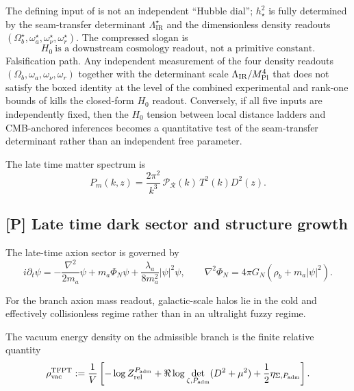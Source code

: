 \begin{remark}
The defining input of  is not an independent ``Hubble dial'';
$h_\star^2$ is fully determined by the seam-transfer determinant $\Lambda_{\mathrm{IR}}^\star$ and
the dimensionless density readouts $(\Omega_b^\star,\omega_a^\star,\omega_\nu^\star,\omega_r^\star)$.
The compressed slogan is
\[
\boxed{\;H_0\ \text{is a downstream cosmology readout, not a primitive constant.}\;}
\]
Falsification path. Any independent measurement of the four density readouts
$(\Omega_b,\omega_a,\omega_\nu,\omega_r)$ together with the determinant scale
$\Lambda_{\mathrm{IR}}/M_{\mathrm{Pl}}^4$ that does not satisfy the boxed identity at the level of the
combined experimental and rank-one bounds of  kills the closed-form
$H_0$ readout. Conversely, if all five inputs are independently fixed, then the
$H_0$ tension between local distance ladders and CMB-anchored inferences becomes a quantitative test
of the seam-transfer determinant rather than an independent free parameter.
\end{remark}

\begin{conjecture}
\label{cor:matter_power_spectrum_readout}
The late time matter spectrum is
\[
P_m(k,z)=\frac{2\pi^2}{k^3}\,\mathcal P_{\mathcal R}(k)\,T^2(k)D^2(z).
\]
\end{conjecture}

\subsection{[P] Late time dark sector and structure growth}

\begin{conjecture}
\label{thm:axion_schrodinger_poisson_closure}
The late-time axion sector is governed by
\[
i\partial_t\psi
=
-\frac{\nabla^2}{2m_a}\psi+m_a\Phi_N\psi+\frac{\lambda_a}{8m_a^2}|\psi|^2\psi,
\qquad
\nabla^2\Phi_N=4\pi G_N(\rho_b+m_a|\psi|^2).
\]
\end{conjecture}

\begin{conjecture}
\label{cor:no_fuzzy_halo_regime}
For the branch axion mass readout, galactic-scale halos lie in the cold and effectively
collisionless regime rather than in an ultralight fuzzy regime.
\end{conjecture}

\begin{conjecture}
\label{thm:relative_admissible_vacuum_energy_finiteness}
The vacuum energy density on the admissible branch is the finite relative quantity
\[
\rho_{\mathrm{vac}}^{\mathrm{TFPT}}
:=
\frac1V\left[-\log Z_{\mathrm{rel}}^{P_{\mathrm{adm}}}+\Re\log\det_{\zeta,P_{\mathrm{adm}}}(D^2+\mu^2)+\frac12\eta_{\Sigma,P_{\mathrm{adm}}}\right].
\]
\end{conjecture}

